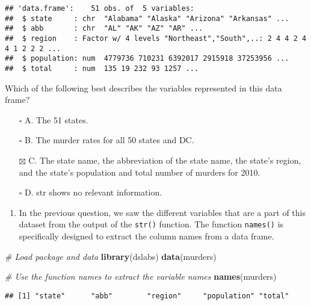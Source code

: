 \documentclass[
]{article}
\newenvironment{Shaded}{\begin{snugshade}}{\end{snugshade}}
\newcommand{\CommentTok}[1]{\textcolor[rgb]{0.56,0.35,0.01}{\textit{#1}}}
\newcommand{\KeywordTok}[1]{\textcolor[rgb]{0.13,0.29,0.53}{\textbf{#1}}}
\newcommand{\NormalTok}[1]{#1}
\providecommand{\tightlist}{%
  \setlength{\itemsep}{0pt}\setlength{\parskip}{0pt}}
\begin{document}
\begin{verbatim}
## 'data.frame':    51 obs. of  5 variables:
##  $ state     : chr  "Alabama" "Alaska" "Arizona" "Arkansas" ...
##  $ abb       : chr  "AL" "AK" "AZ" "AR" ...
##  $ region    : Factor w/ 4 levels "Northeast","South",..: 2 4 4 2 4 4 1 2 2 2 ...
##  $ population: num  4779736 710231 6392017 2915918 37253956 ...
##  $ total     : num  135 19 232 93 1257 ...
\end{verbatim}

Which of the following best describes the variables represented in this
data frame?

\begin{itemize}
\tightlist
\item[$\square$]
  A. The 51 states.
\item[$\square$]
  B. The murder rates for all 50 states and DC.
\item[$\boxtimes$]
  C. The state name, the abbreviation of the state name, the state's
  region, and the state's population and total number of murders for
  2010.
\item[$\square$]
  D. str shows no relevant information.
\end{itemize}

\begin{enumerate}
\def\labelenumi{\arabic{enumi}.}
\setcounter{enumi}{1}
\tightlist
\item
  In the previous question, we saw the different variables that are a
  part of this dataset from the output of the \texttt{str()} function.
  The function \texttt{names()} is specifically designed to extract the
  column names from a data frame.
\end{enumerate}

\begin{Shaded}
\begin{Highlighting}[]
\CommentTok{# Load package and data}
\KeywordTok{library}\NormalTok{(dslabs)}
\KeywordTok{data}\NormalTok{(murders)}
\end{Highlighting}
\end{Shaded}

\begin{Shaded}
\begin{Highlighting}[]
\CommentTok{# Use the function names to extract the variable names }
\KeywordTok{names}\NormalTok{(murders)}
\end{Highlighting}
\end{Shaded}

\begin{verbatim}
## [1] "state"      "abb"        "region"     "population" "total"
\end{verbatim}
\end{document}
